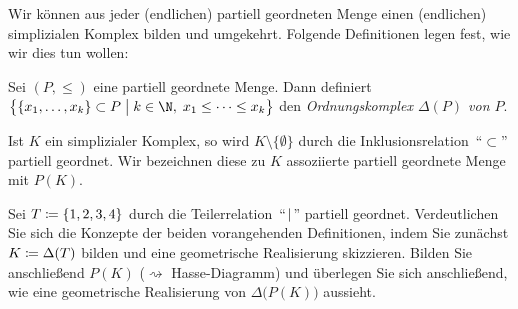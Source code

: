 Wir können aus jeder (endlichen) partiell geordneten Menge einen (endlichen)
simplizialen Komplex bilden und umgekehrt.
Folgende Definitionen legen fest, wie wir dies tun wollen:

\begin{thDef}[Ordnungskomplex]
    Sei $(P,\leq)$ eine partiell geordnete Menge. Dann definiert
    $\bigl\{ \{x_1,\ldots,x_k\} \subset P \cMid[\;]\big 
        k\in\N,\; x_1\leq \dots \leq x_k \bigr\}$
    den \emph{Ordnungskomplex $\Delta(P)$  von $P$}.
\end{thDef}

\begin{thDef}
    Ist $K$ ein simplizialer Komplex, so wird
    $K\setminus\{\emptyset\}$ durch die Inklusionsrelation~\enquote{$\subset$} 
    partiell geordnet. Wir bezeichnen diese zu $K$ assoziierte 
    partiell geordnete Menge mit $P(K)$.
\end{thDef}

\begin{thAufgabe}
    Sei $T \coloneqq \{1,2,3,4\}$ durch die
    Teilerrelation~\enquote{$\mkern1mu|\mkern2mu$} partiell geordnet.
    Verdeutlichen Sie sich die Konzepte der beiden vorangehenden Definitionen,
    indem Sie zunächst $K\coloneqq\Delta(T)$ bilden und eine geometrische Realisierung
    skizzieren. Bilden Sie anschließend $P(K)$ ($\rightsquigarrow$
    Hasse-Diagramm) und überlegen Sie sich anschließend, wie eine geometrische
    Realisierung von $\Delta\bigl(P(K)\bigr)$ aussieht.
\end{thAufgabe}
